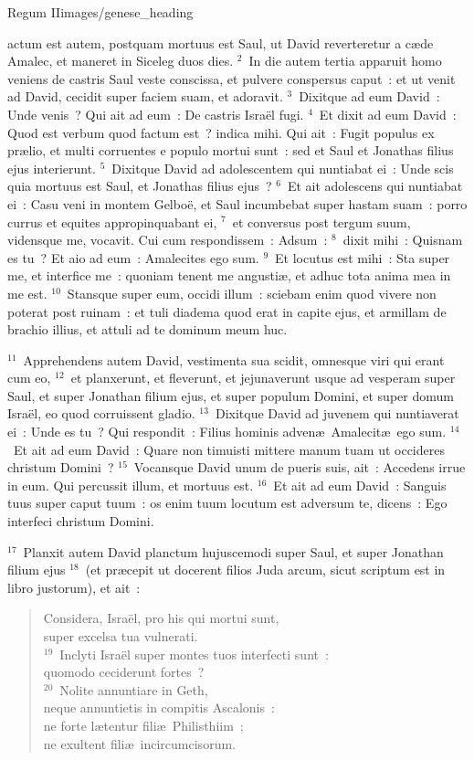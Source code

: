 {Regum II}{images/genese_heading}


\bchapter
{}actum est autem, postquam mortuus est Saul, ut David reverteretur a c\ae de Amalec, et maneret in Siceleg duos dies.
${}^{2}$~In die autem tertia apparuit homo veniens de castris Saul veste conscissa, et pulvere conspersus caput~: et ut venit ad David, cecidit super faciem suam, et adoravit.
${}^{3}$~Dixitque ad eum David~: Unde venis~? Qui ait ad eum~: De castris Isra\"el fugi.
${}^{4}$~Et dixit ad eum David~: Quod est verbum quod factum est~? indica mihi. Qui ait~: Fugit populus ex pr\ae lio, et multi corruentes e populo mortui sunt~: sed et Saul et Jonathas filius ejus interierunt.
${}^{5}$~Dixitque David ad adolescentem qui nuntiabat ei~: Unde scis quia mortuus est Saul, et Jonathas filius ejus~?
${}^{6}$~Et ait adolescens qui nuntiabat ei~: Casu veni in montem Gelbo\"e, et Saul incumbebat super hastam suam~: porro currus et equites appropinquabant ei,
${}^{7}$~et conversus post tergum suum, vidensque me, vocavit. Cui cum respondissem~: Adsum~:
${}^{8}$~dixit mihi~: Quisnam es tu~? Et aio ad eum~: Amalecites ego sum.
${}^{9}$~Et locutus est mihi~: Sta super me, et interfice me~: quoniam tenent me angusti\ae , et adhuc tota anima mea in me est.
${}^{10}$~Stansque super eum, occidi illum~: sciebam enim quod vivere non poterat post ruinam~: et tuli diadema quod erat in capite ejus, et armillam de brachio illius, et attuli ad te dominum meum huc.


${}^{11}$~Apprehendens autem David, vestimenta sua scidit, omnesque viri qui erant cum eo,
${}^{12}$~et planxerunt, et fleverunt, et jejunaverunt usque ad vesperam super Saul, et super Jonathan filium ejus, et super populum Domini, et super domum Isra\"el, eo quod corruissent gladio.
${}^{13}$~Dixitque David ad juvenem qui nuntiaverat ei~: Unde es tu~? Qui respondit~: Filius hominis adven\ae\ Amalecit\ae\ ego sum.
${}^{14}$~Et ait ad eum David~: Quare non timuisti mittere manum tuam ut occideres christum Domini~?
${}^{15}$~Vocansque David unum de pueris suis, ait~: Accedens irrue in eum. Qui percussit illum, et mortuus est.
${}^{16}$~Et ait ad eum David~: Sanguis tuus super caput tuum~: os enim tuum locutum est adversum te, dicens~: Ego interfeci christum Domini.


${}^{17}$~Planxit autem David planctum hujuscemodi super Saul, et super Jonathan filium ejus
${}^{18}$~(et pr\ae cepit ut docerent filios Juda arcum, sicut scriptum est in libro justorum), et ait~: \begin{verse}Considera, Isra\"el, pro his qui mortui sunt,\\ super excelsa tua vulnerati.\\
${}^{19}$~Inclyti Isra\"el super montes tuos interfecti sunt~:\\ quomodo ceciderunt fortes~?\\
${}^{20}$~Nolite annuntiare in Geth,\\ neque annuntietis in compitis Ascalonis~:\\ ne forte l\ae tentur fili\ae\ Philisthiim~;\\ ne exultent fili\ae\ incircumcisorum.\end{verse}


